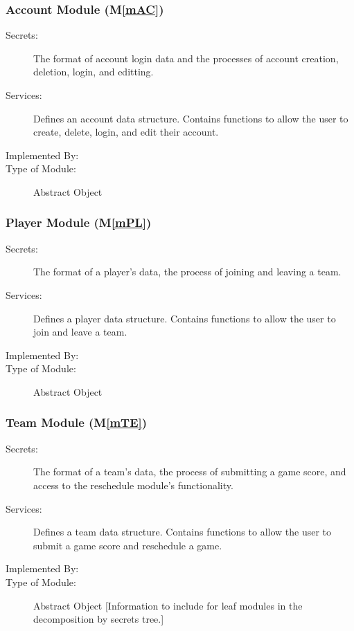 \documentclass[12pt, titlepage]{article}
\newcommand{\mref}[1]{M\ref{#1}}
\begin{document}
\subsubsection{Account Module (\mref{mAC})}

\begin{description}
\item[Secrets:]The format of account login data and the processes of account
creation, deletion, login, and editting.
\item[Services:]Defines an account data structure. Contains functions to allow
the user to create, delete, login, and edit their \progname{} account.
\item[Implemented By:] \progname{}
\item[Type of Module:] Abstract Object
\end{description}

\subsubsection{Player Module (\mref{mPL})}

\begin{description}
\item[Secrets:]The format of a player's data, the process of joining and leaving
a team.
\item[Services:]Defines a player data structure. Contains functions to allow the user
to join and leave a team.
\item[Implemented By:] \progname{}
\item[Type of Module:] Abstract Object
\end{description}

\subsubsection{Team Module (\mref{mTE})}

\begin{description}
\item[Secrets:]The format of a team's data, the process of submitting a game
score, and access to the reschedule module's functionality.
\item[Services:]Defines a team data structure. Contains functions to allow the user
to submit a game score and reschedule a game.
\item[Implemented By:] \progname{}
\item[Type of Module:] Abstract Object
  [Information to include for leaf modules in the decomposition by secrets tree.]
\end{description}
\end{document}

